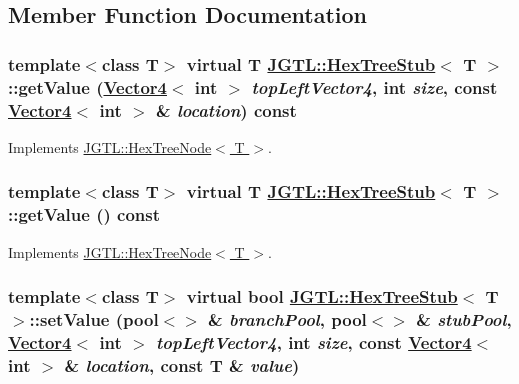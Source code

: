 \subsection{Member Function Documentation}
\hypertarget{class_j_g_t_l_1_1_hex_tree_stub_1ebd4ddd7a7ba70896837b289167f096}{
\subsubsection[getValue]{\setlength{\rightskip}{0pt plus 5cm}template$<$class T$>$ virtual T \hyperlink{class_j_g_t_l_1_1_hex_tree_stub}{JGTL::Hex\-Tree\-Stub}$<$ T $>$::get\-Value (\hyperlink{class_j_g_t_l_1_1_vector4}{Vector4}$<$ int $>$ {\em top\-Left\-Vector4}, int {\em size}, const \hyperlink{class_j_g_t_l_1_1_vector4}{Vector4}$<$ int $>$ \& {\em location}) const}}
\label{class_j_g_t_l_1_1_hex_tree_stub_1ebd4ddd7a7ba70896837b289167f096}




Implements \hyperlink{class_j_g_t_l_1_1_hex_tree_node_64532266729bda54b7473acde6714604}{JGTL::Hex\-Tree\-Node$<$ T $>$}.\hypertarget{class_j_g_t_l_1_1_hex_tree_stub_7babf085fd8c43177bd5ad1e885b2ab5}{
\subsubsection[getValue]{\setlength{\rightskip}{0pt plus 5cm}template$<$class T$>$ virtual T \hyperlink{class_j_g_t_l_1_1_hex_tree_stub}{JGTL::Hex\-Tree\-Stub}$<$ T $>$::get\-Value () const}}
\label{class_j_g_t_l_1_1_hex_tree_stub_7babf085fd8c43177bd5ad1e885b2ab5}




Implements \hyperlink{class_j_g_t_l_1_1_hex_tree_node_81dc320d9ae3cce6b5043696fa70a36d}{JGTL::Hex\-Tree\-Node$<$ T $>$}.\hypertarget{class_j_g_t_l_1_1_hex_tree_stub_0b7ce18da709ea3b283920b279b3a688}{
\subsubsection[setValue]{\setlength{\rightskip}{0pt plus 5cm}template$<$class T$>$ virtual bool \hyperlink{class_j_g_t_l_1_1_hex_tree_stub}{JGTL::Hex\-Tree\-Stub}$<$ T $>$::set\-Value (pool$<$$>$ \& {\em branch\-Pool}, pool$<$$>$ \& {\em stub\-Pool}, \hyperlink{class_j_g_t_l_1_1_vector4}{Vector4}$<$ int $>$ {\em top\-Left\-Vector4}, int {\em size}, const \hyperlink{class_j_g_t_l_1_1_vector4}{Vector4}$<$ int $>$ \& {\em location}, const T \& {\em value})}}
\label{class_j_g_t_l_1_1_hex_tree_stub_0b7ce18da709ea3b283920b279b3a688}




